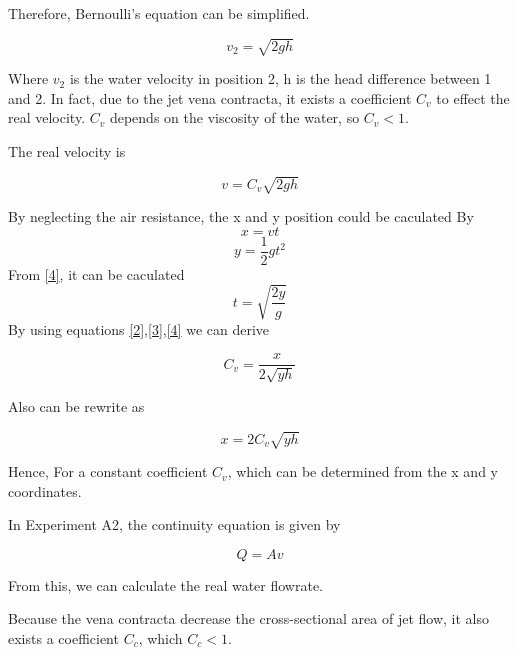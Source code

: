 Therefore, Bernoulli's equation can be simplified.

\begin{equation}
v_2=\sqrt{2gh}
\label{1}
\end{equation}

Where $v_2$ is the water velocity in position 2, h is the head difference between 1 and 2.
In fact, due to the jet vena contracta, it exists a coefficient $C_v$ to effect the real velocity.
$C_v$ depends on the viscosity of the water, so $C_v < 1$.

The real velocity is

\begin{equation}
    v=C_v\sqrt{2gh}
    \label{2}
\end{equation}

By neglecting the air resistance, the x and y position could be caculated By
\begin{equation}
    x=vt  
    \label{3}
\end{equation}
\begin{equation}
    y=\frac{1}{2}gt^2
    \label{x}
\end{equation}
From \autoref{4}, it can be caculated
\begin{equation}
    t=\sqrt{\frac{2y}{g}}
    \label{4}
\end{equation}
By using equations \autoref{2},\autoref{3},\autoref{4} we can derive

\begin{equation}
    C_v=\frac{x}{2\sqrt{yh}}
    \label{5}
\end{equation}

Also can be rewrite as

\begin{equation}
    x=2C_v\sqrt{yh}
    \label{6}
\end{equation}

Hence, For a constant coefficient $C_v$, which can be determined from the x and y coordinates.







In Experiment A2, the continuity equation is given by

\begin{equation}
\label{velocity}
Q=Av
\end{equation}

From this, we can calculate the real water flowrate.

Because the vena contracta decrease the cross-sectional area of jet flow,
it also exists a coefficient $C_c$, which $C_c < 1$.

